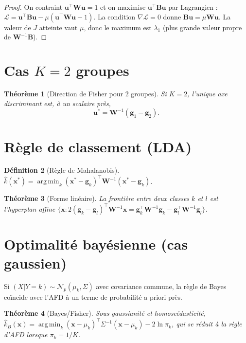\documentclass[11pt, a4paper, openany]{book}
\theoremstyle{plain}
\newtheorem{theorem}{Théorème}[chapter]
\theoremstyle{definition}
\newtheorem{definition}[theorem]{Définition}
\theoremstyle{remark}
\newcommand{\1}{\mathds{1}}
\DeclareMathOperator*{\argmin}{arg\,min}
\newcommand{\B}{\mathbf{B}}
\newcommand{\W}{\mathbf{W}}
\begin{document}
\begin{proof}
On contraint $\mathbf{u}^\top \W \mathbf{u} = 1$ et on maximise $\mathbf{u}^\top \B \mathbf{u}$ par
Lagrangien : $\mathcal{L} = \mathbf{u}^\top \B \mathbf{u} - \mu(\mathbf{u}^\top \W \mathbf{u} - 1)$.
La condition $\nabla \mathcal{L} = 0$ donne $\B \mathbf{u} = \mu \W \mathbf{u}$. La valeur
de $J$ atteinte vaut $\mu$, donc le maximum est $\lambda_1$ (plus grande
valeur propre de $\W^{-1} \B$).
\end{proof}

\section{Cas $K = 2$ groupes}

\begin{theorem}[Direction de Fisher pour 2 groupes]
Si $K = 2$, l'unique axe discriminant est, à un scalaire près,
\[
\mathbf{u}^* = \W^{-1}(\mathbf{g}_1 - \mathbf{g}_2).
\]
\end{theorem}

\section{Règle de classement (LDA)}

\begin{definition}[Règle de Mahalanobis]
$\hat{k}(\mathbf{x}^*) = \argmin_k (\mathbf{x}^* - \mathbf{g}_k)^\top \W^{-1} (\mathbf{x}^* - \mathbf{g}_k)$.
\end{definition}

\begin{theorem}[Forme linéaire]
La frontière entre deux classes $k$ et $l$ est l'hyperplan affine
$\{\mathbf{x} : 2(\mathbf{g}_k - \mathbf{g}_l)^\top \W^{-1} \mathbf{x} = \mathbf{g}_k^\top \W^{-1} \mathbf{g}_k - \mathbf{g}_l^\top \W^{-1} \mathbf{g}_l\}$.
\end{theorem}

\section{Optimalité bayésienne (cas gaussien)}

Si $(X | Y = k) \sim \mathcal{N}_p(\mu_k, \Sigma)$ avec covariance commune,
la règle de Bayes coïncide avec l'AFD à un terme de probabilité a priori près.

\begin{theorem}[Bayes/Fisher]
Sous gaussianité et homoscédasticité, $\hat{k}_B(\mathbf{x}) = \argmin_k (\mathbf{x} - \mu_k)^\top \Sigma^{-1} (\mathbf{x} - \mu_k) - 2 \ln \pi_k$,
qui se réduit à la règle d'AFD lorsque $\pi_k = 1/K$.
\end{theorem}
\end{document}

